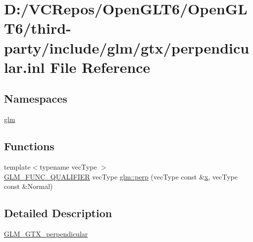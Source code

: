 \hypertarget{perpendicular_8inl}{}\section{D\+:/\+V\+C\+Repos/\+Open\+G\+L\+T6/\+Open\+G\+L\+T6/third-\/party/include/glm/gtx/perpendicular.inl File Reference}
\label{perpendicular_8inl}
\subsection*{Namespaces}
\begin{DoxyCompactItemize}
\item 
 \mbox{\hyperlink{namespaceglm}{glm}}
\end{DoxyCompactItemize}
\subsection*{Functions}
\begin{DoxyCompactItemize}
\item 
{\footnotesize template$<$typename vec\+Type $>$ }\\\mbox{\hyperlink{setup_8hpp_a33fdea6f91c5f834105f7415e2a64407}{G\+L\+M\+\_\+\+F\+U\+N\+C\+\_\+\+Q\+U\+A\+L\+I\+F\+I\+ER}} vec\+Type \mbox{\hyperlink{group__gtx__perpendicular_ga41f8c73da9798a18e6b1e32f1e301f07}{glm\+::perp}} (vec\+Type const \&\mbox{\hyperlink{glad_8h_a92d0386e5c19fb81ea88c9f99644ab1d}{x}}, vec\+Type const \&Normal)
\end{DoxyCompactItemize}


\subsection{Detailed Description}
\mbox{\hyperlink{group__gtx__perpendicular}{G\+L\+M\+\_\+\+G\+T\+X\+\_\+perpendicular}} 